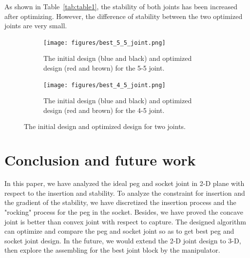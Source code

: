\documentclass[11pt, twocolumn]{article}
\begin{document}
As shown in Table~\ref{tab:table1}, the stability of both joints has been increased after optimizing. However, the difference of stability between the two optimized joints are very small. 

\begin{figure}
\begin{center}
\begin{subfigure}[t]{0.24\textwidth}
\begin{center}
\texttt{[image: figures/best\_5\_5\_joint.png]}
\end{center}
\caption{The initial design (blue and black) and optimized design (red and brown) for the 5-5 joint. }
\label{fig:best_5_5_joint}
\end{subfigure}
\begin{subfigure}[t]{0.24\textwidth}
\begin{center}
\texttt{[image: figures/best\_4\_5\_joint.png]}
\end{center}
\caption{The initial design (blue and black) and optimized design (red and brown) for the 4-5 joint. }
\label{fig:best_4_5_joint}
\end{subfigure}
\caption{The initial design and optimized design for two joints. }
\label{fig:best_joint}
\end{center}
\end{figure}

\section{Conclusion and future work}

In this paper, we have analyzed the ideal peg and socket joint in 2-D plane with respect to the insertion and stability. To analyze the constraint for insertion and the gradient of the stability, we have discretized the insertion process and the "rocking" process for the peg in the socket. Besides, we have proved the concave joint is better than convex joint with respect to capture. The designed algorithm can optimize and compare the peg and socket joint so as to get best peg and socket joint design. In the future, we would extend the 2-D joint design to 3-D, then explore the assembling for the best joint block by the manipulator. 

\renewcommand*{\bibfont}{\small}
\printbibliography
\end{document}
